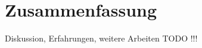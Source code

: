 \chapter{Zusammenfassung}
\label{cha:Zusammenfassung}


\todo

Diskussion, Erfahrungen, weitere Arbeiten
TODO !!!
